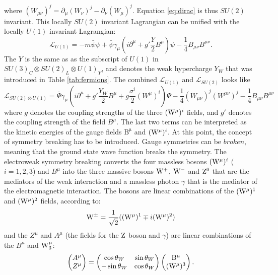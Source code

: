 where $(W_{\mu\nu})^{j}=\partial_{\mu}(W_{\nu})^{j}-\partial_{\nu}(W_{\mu})^{j}$. 
Equation \ref{eq:dirac} is thus $SU(2)$ invariant.  
This locally $SU(2)$ invariant Lagrangian can be unified with the locally $U(1)$ invariant Lagrangian:
\begin{equation}
\mathcal{L}_{U(1)}=-m\bar{\psi}\psi+\bar{\psi}\gamma_{\mu}(i\partial^{\mu}+g'\frac{Y}{2}B^{\mu})\psi-\frac{1}{4}B_{\mu\nu}B^{\mu\nu}.
\end{equation}                                               
The $Y$ is the same as as the subscript of $U(1)$ in $SU(3)_{C}\otimes SU(2)_{L}\otimes U(1)_{Y}$, and denotes the weak hypercharge $Y_{W}$ that was introduced in Table \ref{tab:fermions}. 
The combined $\mathcal{L}_{U(1)}$ and $\mathcal{L}_{SU(2)}$ looks like
\begin{equation}
\mathcal{L}_{SU(2)\otimes U(1)}=\bar{\Psi}\gamma_{\mu}(i\partial^{\mu}+g'\frac{Y_{W}}{2}B^{\mu}+g\frac{\sigma^{i}}{2}(W^{\mu})^{i})\Psi-\frac{1}{4}(W_{\mu\nu})^{j}(W^{\mu\nu})^{j}-\frac{1}{4}B_{\mu\nu}B^{\mu\nu} 
\label{eq:ewkLagrange}
\end{equation}                                                
where $g$ denotes the coupling strengths of the three $(\mathrm{W}^{\mu})^{i}$ fields, and $g'$ denotes the coupling strength of the field $B^{\mu}$. 
The last two terms can be interpreted as the kinetic energies of the gauge fields $\mathrm{B^{\mu}}$ and $(\mathrm{W}^{\mu})^{i}$.
At this point, the concept of symmetry breaking has to be introduced. 
Gauge symmetries can be $broken$, meaning that the ground state wave function breaks the symmetry. 
The electroweak symmetry breaking converts the four massless bosons $(\mathrm{W}^{\mu})^{i}$ ($i=1,2,3$) and $B^{\mu}$ into the three massive bosons $\mathrm{W}^{+}$, $\mathrm{W}^{-}$ and $\mathrm{Z}^{0}$ that are the mediators of the weak interaction and a massless photon $\gamma$ that is the mediator of the electromagnetic interaction. 
The \PW bosons are linear combinations of the $(\mathrm{W}^{\mu})^{1}$ and $(\mathrm{W}^{\mu})^{2}$  fields, according to:
\begin{equation} 
\mathrm{W}^{\pm}=\frac{1}{\sqrt{2}}((\mathrm{W}^{\mu})^{1}\mp i(\mathrm{W}^{\mu})^{2})
\label{eq:Widentities}
\end{equation} 
and the $Z^{\mu}$ and $A^{\mu}$ (the fields for the $\mathrm{Z}$ boson and $\gamma$) are linear combinations of the $B^{\mu}$ and $\mathrm{W}_{3}^{\mu}$: 
\begin{equation} 
\begin{pmatrix} A^{\mu}\\ Z^{\mu}\end{pmatrix}=
\begin{pmatrix} 
    \cos\theta_{W}  & \sin\theta_{W}\\
    -\sin\theta_{W} & \cos\theta_{W}\\
\end{pmatrix}
\begin{pmatrix} \mathrm{B}^{\mu}\\ (\mathrm{W}^{\mu})^{3}\end{pmatrix}.
\label{eq:Zidentities}
\end{equation} 

